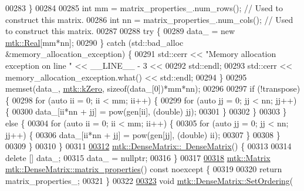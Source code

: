 \begin{DoxyCode}
00283   \}
00284 
00285   \textcolor{keywordtype}{int} mm = matrix\_properties\_.num\_rows(); \textcolor{comment}{// Used to construct this matrix.}
00286   \textcolor{keywordtype}{int} nn = matrix\_properties\_.num\_cols(); \textcolor{comment}{// Used to construct this matrix.}
00287 
00288   \textcolor{keywordflow}{try} \{
00289     data\_ = \textcolor{keyword}{new} \hyperlink{group__c01-roots_gac080bbbf5cbb5502c9f00405f894857d}{mtk::Real}[mm*nn];
00290   \} \textcolor{keywordflow}{catch} (std::bad\_alloc &memory\_allocation\_exception) \{
00291     std::cerr << \textcolor{stringliteral}{"Memory allocation exception on line "} << \_\_LINE\_\_ - 3 <<
00292       std::endl;
00293     std::cerr << memory\_allocation\_exception.what() << std::endl;
00294   \}
00295   memset(data\_, \hyperlink{group__c01-roots_ga59a451a5fae30d59649bcda274fea271}{mtk::kZero}, \textcolor{keyword}{sizeof}(data\_[0])*mm*nn);
00296 
00297   \textcolor{keywordflow}{if} (!transpose) \{
00298     \textcolor{keywordflow}{for} (\textcolor{keyword}{auto} ii = 0; ii < mm; ii++) \{
00299       \textcolor{keywordflow}{for} (\textcolor{keyword}{auto} jj = 0; jj < nn; jj++) \{
00300         data\_[ii*nn + jj] = pow(gen[ii], (\textcolor{keywordtype}{double}) jj);
00301       \}
00302     \}
00303   \} \textcolor{keywordflow}{else} \{
00304     \textcolor{keywordflow}{for} (\textcolor{keyword}{auto} ii = 0; ii < mm; ii++) \{
00305       \textcolor{keywordflow}{for} (\textcolor{keyword}{auto} jj = 0; jj < nn; jj++) \{
00306         data\_[ii*nn + jj] = pow(gen[jj], (\textcolor{keywordtype}{double}) ii);
00307       \}
00308     \}
00309   \}
00310 \}
00311 
\hypertarget{mtk__dense__matrix_8cc_source_l00312}{}\hyperlink{classmtk_1_1DenseMatrix_a8d4a0df33bd4e4edf5d2fe5539885b85}{00312} \hyperlink{classmtk_1_1DenseMatrix_a8d4a0df33bd4e4edf5d2fe5539885b85}{mtk::DenseMatrix::~DenseMatrix}() \{
00313 
00314   \textcolor{keyword}{delete} [] data\_;
00315   data\_ = \textcolor{keyword}{nullptr};
00316 \}
00317 
\hypertarget{mtk__dense__matrix_8cc_source_l00318}{}\hyperlink{classmtk_1_1DenseMatrix_a5aa83a0643f27a4652ea97630edf7143}{00318} \hyperlink{classmtk_1_1Matrix}{mtk::Matrix} \hyperlink{classmtk_1_1DenseMatrix_a5aa83a0643f27a4652ea97630edf7143}{mtk::DenseMatrix::matrix\_properties}() const 
      noexcept \{
00319 
00320   \textcolor{keywordflow}{return} matrix\_properties\_;
00321 \}
00322 
\hypertarget{mtk__dense__matrix_8cc_source_l00323}{}\hyperlink{classmtk_1_1DenseMatrix_a178e63f365cf8c547dc5020c60357f5e}{00323} \textcolor{keywordtype}{void} \hyperlink{classmtk_1_1DenseMatrix_a178e63f365cf8c547dc5020c60357f5e}{mtk::DenseMatrix::SetOrdering}(

\end{DoxyCode}

